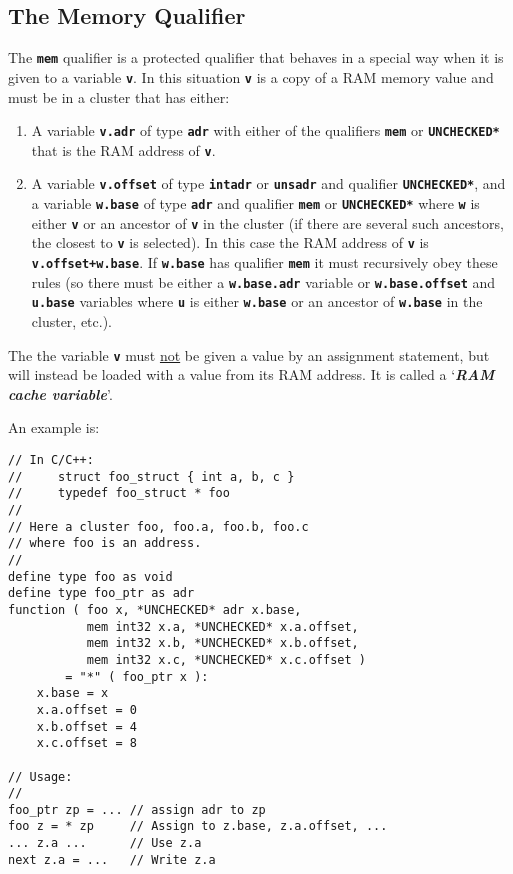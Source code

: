 \documentclass[12pt]{article}
\makeatletter
\newcommand{\TT}[1]{{\tt \bfseries #1}}
\newcommand{\key}[1]{{\bf \em #1}\index{#1}}
\newcommand{\ttkey}[1]{\TT{#1}\index{#1@{\tt #1}}}
\newenvironment{indpar}[1][0.3in]%
	{\begin{list}{}%
		     {\setlength{\itemsep}{0in}%
		      \setlength{\topsep}{0in}%
		      \setlength{\parsep}{1ex}%
		      \setlength{\labelwidth}{#1}%
		      \setlength{\leftmargin}{#1}%
		      \addtolength{\leftmargin}{\labelsep}}%
	 \item}%
	{\end{list}}
\makeatother
\begin{document}
\subsection{The Memory Qualifier}
\label{THE-MEM-QUALIFIER}

The \ttkey{mem} qualifier is a protected qualifier that behaves
in a special way when it is given to a variable \TT{v}.
In this situation \TT{v} is a copy of a RAM memory value and
must be in a cluster that
has either:
\begin{enumerate}
\item
A variable \TT{v.adr} of type \TT{adr} with either of the qualifiers
\TT{mem} or \TT{*UNCHECKED*} that is the RAM address of \TT{v}.

\item
A variable \TT{v.offset} of type \TT{intadr} or \TT{unsadr} and
qualifier \TT{*UNCHECKED*}, and
a variable \TT{w.base} of type \TT{adr} and qualifier \TT{mem}
or \TT{*UNCHECKED*} where \TT{w} is either \TT{v} or an ancestor
of \TT{v} in the cluster (if there are several such ancestors, the
closest to \TT{v} is selected).
In this case the RAM address of \TT{v} is \TT{v.offset+w.base}.
If \TT{w.base} has qualifier \TT{mem} it must recursively obey these
rules (so there must be either a \TT{w.base.adr} variable
or \TT{w.base.offset} and \TT{u.base} variables where \TT{u}
is either \TT{w.base} or an ancestor of \TT{w.base} in the cluster, etc.).
\end{enumerate}
The the
variable \TT{v} must \underline{not} be given a value by an
assignment statement, but will instead be loaded with a value
from its RAM address.  It is called a `\key{RAM cache variable}'.

An example is:

\begin{indpar}\begin{verbatim}
// In C/C++:
//     struct foo_struct { int a, b, c }
//     typedef foo_struct * foo
//
// Here a cluster foo, foo.a, foo.b, foo.c
// where foo is an address.
//
define type foo as void
define type foo_ptr as adr
function ( foo x, *UNCHECKED* adr x.base,
           mem int32 x.a, *UNCHECKED* x.a.offset,
           mem int32 x.b, *UNCHECKED* x.b.offset,
           mem int32 x.c, *UNCHECKED* x.c.offset )
        = "*" ( foo_ptr x ):
    x.base = x
    x.a.offset = 0
    x.b.offset = 4
    x.c.offset = 8

// Usage:
//
foo_ptr zp = ... // assign adr to zp
foo z = * zp     // Assign to z.base, z.a.offset, ...
... z.a ...      // Use z.a
next z.a = ...   // Write z.a

\end{verbatim}\end{indpar}
\end{document}
